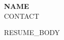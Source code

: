 \documentclass[letterpaper,11pt]{article}
\begin{document}
\begin{center}
{\LARGE\bfseries {{NAME}}}\\[5pt]
{\small {{CONTACT}}}
\end{center}
{{RESUME_BODY}}
\end{document}
